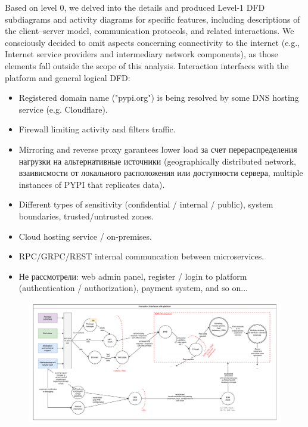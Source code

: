 \documentclass[letterpaper,12pt]{report}
\begin{document}
Based on level 0, we delved into the details and produced Level-1 DFD subdiagrams and activity diagrams for specific features, including descriptions of the client–server model, communication protocols, and related interactions. We consciously decided to omit aspects concerning connectivity to the internet (e.g., Internet service providers and intermediary network components), as those elements fall outside the scope of this analysis.
Interaction interfaces with the platform and general logical DFD:
\begin{itemize}
    \item Registered domain name ("pypi.org") is being resolved by some DNS hosting service (e.g. Cloudflare).
    \item Firewall limiting activity and filters traffic.
    \item Mirroring and reverse proxy garantees lower load за счет перераспределения нагрузки на альтернативные источники (geographically distributed network, взаивисмости от локального расположения или доступности сервера, multiple instances of PYPI that replicates data).
    \item Different types of sensitivity (confidential / internal / public), system boundaries, trusted/untrusted zones.
    \item Cloud hosting service / on-premises.
    \item RPC/GRPC/REST internal communcation between microservices.
    \item Не рассмотрели: web admin panel, register / login to platform (authentication / authorization), payment system, and so on...
\end{itemize}

\begin{figure}[htpb!]
    \centering
    \includegraphics[width=1\textwidth]{figure_3}
    \caption[Interaction interfaces with the platform]
    \label{fig:figure3}
\end{figure}
\end{document}
